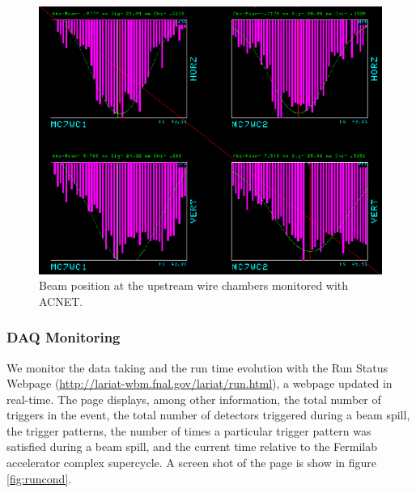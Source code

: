 \begin{figure}[htb]
\centering
\includegraphics[scale=0.5]{Chapter-3/Images/BeamPosition.png}
\caption{Beam position at the upstream wire chambers monitored with ACNET.}
\label{fig:ACNET}
\end{figure}

\subsubsection{DAQ Monitoring}

We monitor the data taking and the run time evolution with the Run Status Webpage (\href{http://lariat-wbm.fnal.gov/lariat/run.html}{http://lariat-wbm.fnal.gov/lariat/run.html}), a  webpage updated in real-time.  The page displays, among other information, the total number of triggers in the event, the total number of detectors triggered during a beam spill,  the trigger patterns, the number of times a particular trigger pattern was satisfied  during a beam spill, and the current time relative to the Fermilab accelerator complex supercycle. A screen shot of the page is show in figure \ref{fig:runcond}.

